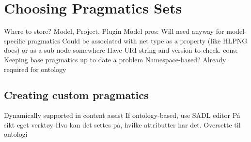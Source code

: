 \section{Choosing Pragmatics Sets}
Where to store? Model, Project, Plugin
Model pros:
	Will need anyway for model-specific pragmatics
	Could be associated with net type as a property (like HLPNG does) or as a sub
	node somewhere
	Have URI string and version to check.
cons:
	Keeping base pragmatics up to date a problem
Namespace-based? Already required for ontology


	\subsection{Creating custom pragmatics}
	Dynamically supported in content assist 
	If ontology-based, use SADL editor
	På sikt eget verktøy
		Hva kan det settes på, hvilke attributter har det.
		Oversette til ontologi

